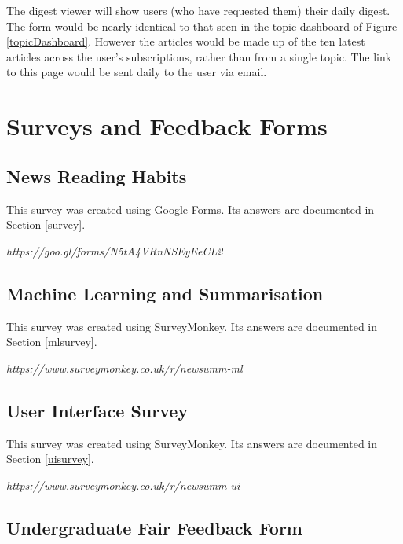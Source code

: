 \documentclass[12pt]{article}
\begin{document}
\begin{appendices}
The digest viewer will show users (who have requested them) their daily digest. The form would be nearly identical to that seen in the topic dashboard of Figure \ref{topicDashboard}. However the articles would be made up of the ten latest articles across the user's subscriptions, rather than from a single topic. The link to this page would be sent daily to the user via email.


\newpage

\section{Surveys and Feedback Forms}

\subsection{News Reading Habits}

\label{nrh}

This survey was created using Google Forms. Its answers are documented in Section \ref{survey}.

\emph{https://goo.gl/forms/N5tA4VRnNSEyEeCL2}

\subsection{Machine Learning and Summarisation}

\label{mls}

This survey was created using SurveyMonkey. Its answers are documented in Section \ref{mlsurvey}.

\emph{https://www.surveymonkey.co.uk/r/newsumm-ml}

\subsection{User Interface Survey}

\label{uis}

This survey was created using SurveyMonkey. Its answers are documented in Section \ref{uisurvey}.

\emph{https://www.surveymonkey.co.uk/r/newsumm-ui}

\subsection{Undergraduate Fair Feedback Form}


\end{appendices}
\end{document}
